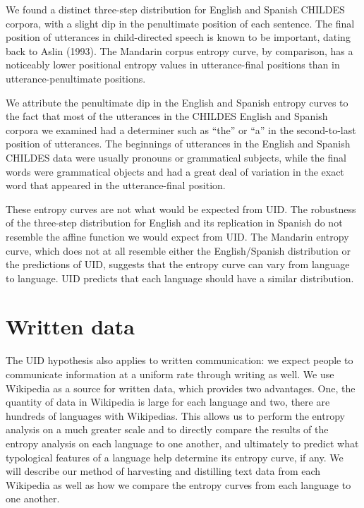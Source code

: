 \documentclass[10pt, letterpaper]{article}
\begin{document}
We found a distinct three-step distribution for English and Spanish
CHILDES corpora, with a slight dip in the penultimate position of each
sentence. The final position of utterances in child-directed speech is
known to be important, dating back to Aslin (1993). The Mandarin corpus
entropy curve, by comparison, has a noticeably lower positional entropy
values in utterance-final positions than in utterance-penultimate
positions.

We attribute the penultimate dip in the English and Spanish entropy
curves to the fact that most of the utterances in the CHILDES English
and Spanish corpora we examined had a determiner such as ``the'' or
``a'' in the second-to-last position of utterances. The beginnings of
utterances in the English and Spanish CHILDES data were usually pronouns
or grammatical subjects, while the final words were grammatical objects
and had a great deal of variation in the exact word that appeared in the
utterance-final position.

These entropy curves are not what would be expected from UID. The
robustness of the three-step distribution for English and its
replication in Spanish do not resemble the affine function we would
expect from UID. The Mandarin entropy curve, which does not at all
resemble either the English/Spanish distribution or the predictions of
UID, suggests that the entropy curve can vary from language to language.
UID predicts that each language should have a similar distribution.

\hypertarget{written-data}{%
\section{Written data}\label{written-data}}

The UID hypothesis also applies to written communication: we expect
people to communicate information at a uniform rate through writing as
well. We use Wikipedia as a source for written data, which provides two
advantages. One, the quantity of data in Wikipedia is large for each
language and two, there are hundreds of languages with Wikipedias. This
allows us to perform the entropy analysis on a much greater scale and to
directly compare the results of the entropy analysis on each language to
one another, and ultimately to predict what typological features of a
language help determine its entropy curve, if any. We will describe our
method of harvesting and distilling text data from each Wikipedia as
well as how we compare the entropy curves from each language to one
another.
\end{document}
